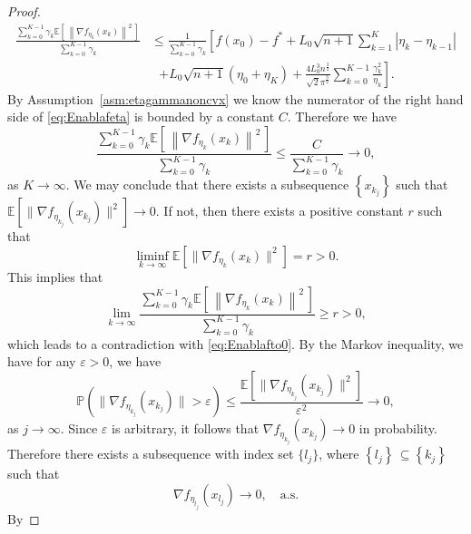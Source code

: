 \documentclass[11pt,reqno]{amsart}
\newcommand{\1}{{\bf 1}}
\newcommand{\2}{{\bf 2}}
\newcommand{\E}{\mathbb E}
\numberwithin{equation}{section}
\theoremstyle{remark}
\begin{document}
{\begin{proof}
\begin{align}
					\frac{\sum_{k=0}^{K-1}\gamma_k\mathbb{E}\left[\, \left\|\nabla f_{\eta_k}(x_k)\right\|^2\, \right]}{\sum_{k=0}^{K-1}\gamma_k} &\leq \frac{1}{\sum_{k=0}^{K-1}\gamma_k} \left[f(x_0)-f^*+L_0\sqrt{n+1}\sum_{k=1}^K|\eta_k-\eta_{k-1}|\right.\nonumber\\
					&~~~\left.+L_0\sqrt{n+1}(\eta_0+\eta_K)  +\frac{4L_0^3n^{\frac{3}{2}}}{\sqrt{2}\pi^{\frac{3}{2}}}\sum_{k=0}^{K-1}\frac{\gamma_k^2}{\eta_k} \right].
				\end{align}
				By Assumption~\ref{asm:etagammanoncvx} we know the numerator of the right hand side of \eqref{eq:Enablafeta} is bounded by a constant $C$. Therefore we have 
				\begin{equation}\label{eq:Enablafto0}
					\frac{\sum_{k=0}^{K-1}\gamma_k\mathbb{E}\left[\, \left\|\nabla f_{\eta_k}(x_k)\right\|^2\, \right]}{\sum_{k=0}^{K-1}\gamma_k} \leq\frac{C}{\sum_{k=0}^{K-1}\gamma_k}\rightarrow 0 ,
				\end{equation}
				as $K\rightarrow\infty$. We {may} conclude that there exists a subsequence {$\left\{x_{k_j}\right\}$} such that $\E[\|\nabla f_{\eta_{k_j}}(x_{k_j})\|^2]\rightarrow 0$. If not, then there exists a positive constant $r$ such that $$ \liminf_{k \rightarrow \infty}\E\left[\|\nabla f_{\eta_{k}}(x_{k})\|^2\right]=r>0.$$ This implies that 
				\begin{equation*}
					\lim_{k\rightarrow\infty}\frac{\sum_{k=0}^{K-1}\gamma_k\mathbb{E}\left[\, \left\|\nabla f_{\eta_k}(x_k)\right\|^2\, \right]}{\sum_{k=0}^{K-1}\gamma_k}\geq r>0,
				\end{equation*}
				which {leads to} a contradiction {with} \eqref{eq:Enablafto0}. By  the Markov inequality, we have for any $\varepsilon>0$, we have 
				\begin{equation*}
					\mathbb{P}\left(\|\nabla f_{\eta_{k_j}}(x_{k_j})\|>\varepsilon\right)\leq \frac{\E\left[\|\nabla f_{\eta_{k_j}}(x_{k_j})\|^2\right]}{\varepsilon^2}\rightarrow0,
				\end{equation*}
				as $j\rightarrow\infty$. Since $\varepsilon$ is arbitrary, it follows that $\nabla f_{\eta_{k_j}}(x_{k_j}) \rightarrow 0$ in probability. Therefore there exists a subsequence {with index set  $\{ l_j\}$, where $\left\{l_j\right\}  \, \subseteq \left\{ k_j\right\}$} such that 
				\begin{equation}\label{eq:nablafa.s.}
					\nabla f_{\eta_{l_j}}(x_{l_j}) \rightarrow 0, \quad\text{a.s.} 
				\end{equation}
				By %

\end{proof}}
\end{document}
